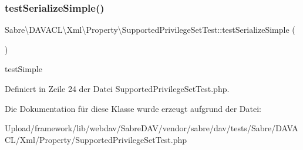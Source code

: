 \subsubsection{\texorpdfstring{test\+Serialize\+Simple()}{testSerializeSimple()}}
{\footnotesize\ttfamily Sabre\textbackslash{}\+D\+A\+V\+A\+C\+L\textbackslash{}\+Xml\textbackslash{}\+Property\textbackslash{}\+Supported\+Privilege\+Set\+Test\+::test\+Serialize\+Simple (\begin{DoxyParamCaption}{ }\end{DoxyParamCaption})}

test\+Simple 

Definiert in Zeile 24 der Datei Supported\+Privilege\+Set\+Test.\+php.



Die Dokumentation für diese Klasse wurde erzeugt aufgrund der Datei\+:\begin{DoxyCompactItemize}
\item 
Upload/framework/lib/webdav/\+Sabre\+D\+A\+V/vendor/sabre/dav/tests/\+Sabre/\+D\+A\+V\+A\+C\+L/\+Xml/\+Property/Supported\+Privilege\+Set\+Test.\+php\end{DoxyCompactItemize}
